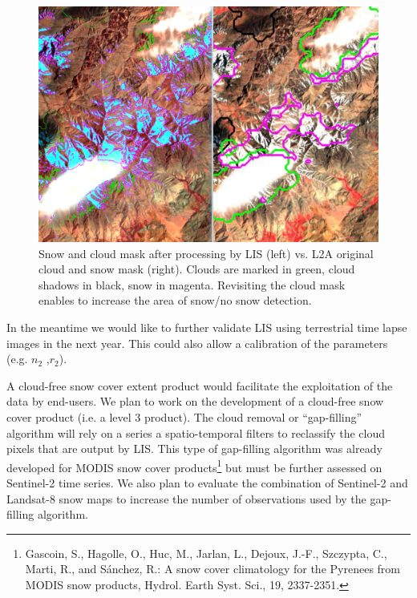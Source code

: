 \documentclass[a4paper]{article}
\begin{document}
\begin{figure}[h]
 \centering
 \includegraphics[width=\textwidth]{./images/Maroc_20130327_S4T5.png}
 \caption{Snow and cloud mask after processing by LIS (left) vs. L2A original cloud and snow mask (right). Clouds are marked in green, cloud shadows in black, snow in magenta. Revisiting the cloud mask enables to increase the area of snow/no snow detection.}
 \label{fig:L2AvsLIS}
\end{figure}


In the meantime we would like to further validate LIS using terrestrial time lapse images in the next year. This could also allow a calibration of the parameters (e.g. $n_2$ ,$r_2$). 

A cloud-free snow cover extent product would facilitate the exploitation of the data by end-users. We plan to work on the development of a cloud-free snow cover product (i.e. a level 3 product). The cloud removal or ``gap-filling'' algorithm will rely on a series a spatio-temporal filters to reclassify the cloud pixels that are output by LIS. This type of gap-filling algorithm was already developed for MODIS snow cover products\footnote{Gascoin, S., Hagolle, O., Huc, M., Jarlan, L., Dejoux, J.-F., Szczypta, C., Marti, R., and Sánchez, R.: A snow cover climatology for the Pyrenees from MODIS snow products, Hydrol. Earth Syst. Sci., 19, 2337-2351.} but must be further assessed on Sentinel-2 time series. We also plan to evaluate the combination of Sentinel-2 and Landsat-8 snow maps to increase the number of observations used by the gap-filling algorithm. 

\clearpage

\appendix


\end{document}
